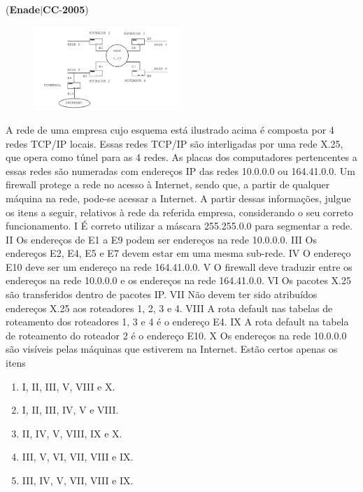 \documentclass{exam}
\begin{document}
\begin{questions}
\question (\textbf{Enade}$|$\textbf{CC}-\textbf{2005}) \begin{figure}[H]
	\begin{center}
		\includegraphics[width=0.5\textwidth]{CIENCIA_DA_COMPUTACAO_Prova2005-utf8_figuras/fig-0034.jpg}
	\end{center}
\end{figure}
A rede de uma empresa cujo esquema está ilustrado
acima é composta por 4 redes TCP/IP locais. Essas redes
TCP/IP são interligadas por uma rede X.25, que opera
como túnel para as 4 redes. As placas dos computadores
pertencentes a essas redes são numeradas com endereços IP
das redes 10.0.0.0 ou 164.41.0.0. Um firewall protege a
rede no acesso à Internet, sendo que, a partir de qualquer
máquina na rede, pode-se acessar a Internet.
A partir dessas informações, julgue os itens a seguir, relativos à
rede da referida empresa, considerando o seu correto
funcionamento.
I É correto utilizar a máscara 255.255.0.0 para segmentar a
rede.
II Os endereços de E1 a E9 podem ser endereços na rede
10.0.0.0.
III Os endereços E2, E4, E5 e E7 devem estar em uma mesma
sub-rede.
IV O endereço E10 deve ser um endereço na rede 164.41.0.0.
V O firewall deve traduzir entre os endereços na rede 10.0.0.0
e os endereços na rede 164.41.0.0.
VI Os pacotes X.25 são transferidos dentro de pacotes IP.
VII Não devem ter sido atribuídos endereços X.25 aos
roteadores 1, 2, 3 e 4.
VIII A rota default nas tabelas de roteamento dos roteadores
1, 3 e 4 é o endereço E4.
IX A rota default na tabela de roteamento do roteador 2 é o
endereço E10.
X Os endereços na rede 10.0.0.0 são visíveis pelas máquinas
que estiverem na Internet.
Estão certos apenas os itens
	\begin{enumerate}[label=\alph*)]
		\item  I, II, III, V, VIII e X.
		\item  I, II, III, IV, V e VIII.
		\item  II, IV, V, VIII, IX e X.
		\item  III, V, VI, VII, VIII e IX.
		\item  III, IV, V, VII, VIII e IX.


\end{enumerate}
\end{questions}
\end{document}
